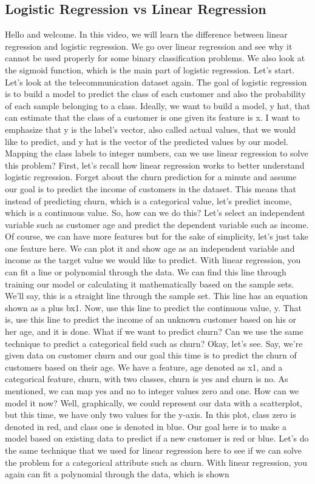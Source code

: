 	
	\subsection{Logistic Regression vs Linear Regression}
	
	
	Hello and welcome. In this video, we will learn the difference between linear regression and logistic regression. We go over linear regression and see why it cannot be used properly for some binary classification problems. We also look at the sigmoid function, which is the main part of logistic regression. Let's start. Let's look at the telecommunication dataset again. The goal of logistic regression is to build a model to predict the class of each customer and also the probability of each sample belonging to a class. Ideally, we want to build a model, y hat, that can estimate that the class of a customer is one given its feature is x. I want to emphasize that y is the label's vector, also called actual values, that we would like to predict, and y hat is the vector of the predicted values by our model. Mapping the class labels to integer numbers, can we use linear regression to solve this problem? First, let's recall how linear regression works to better understand logistic regression. Forget about the churn prediction for a minute and assume our goal is to predict the income of customers in the dataset. This means that instead of predicting churn, which is a categorical value, let's predict income, which is a continuous value. So, how can we do this? Let's select an independent variable such as customer age and predict the dependent variable such as income. Of course, we can have more features but for the sake of simplicity, let's just take one feature here. We can plot it and show age as an independent variable and income as the target value we would like to predict. With linear regression, you can fit a line or polynomial through the data. We can find this line through training our model or calculating it mathematically based on the sample sets. We'll say, this is a straight line through the sample set. This line has an equation shown as a plus bx1. Now, use this line to predict the continuous value, y. That is, use this line to predict the income of an unknown customer based on his or her age, and it is done. What if we want to predict churn? Can we use the same technique to predict a categorical field such as churn? Okay, let's see. Say, we're given data on customer churn and our goal this time is to predict the churn of customers based on their age. We have a feature, age denoted as x1, and a categorical feature, churn, with two classes, churn is yes and churn is no. As mentioned, we can map yes and no to integer values zero and one. How can we model it now? Well, graphically, we could represent our data with a scatterplot, but this time, we have only two values for the y-axis. In this plot, class zero is denoted in red, and class one is denoted in blue. Our goal here is to make a model based on existing data to predict if a new customer is red or blue. Let's do the same technique that we used for linear regression here to see if we can solve the problem for a categorical attribute such as churn. With linear regression, you again can fit a polynomial through the data, which is shown 